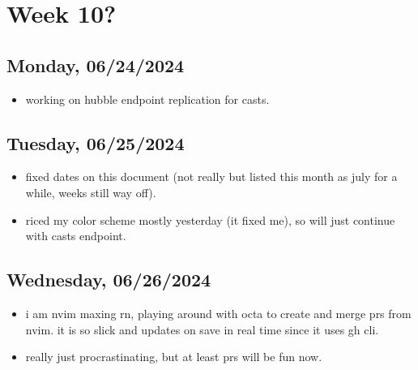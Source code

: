 \newpage
\section{Week 10?}
\subsection*{Monday, 06/24/2024}
\begin{itemize}
    \item working on hubble endpoint replication for casts. 
\end{itemize}

\subsection*{Tuesday, 06/25/2024}
\begin{itemize}
    \item fixed dates on this document (not really but listed this month as july
        for a while, weeks still way off).
    \item riced my color scheme mostly yesterday (it fixed me), so will just
        continue with casts endpoint. 
\end{itemize}

\subsection*{Wednesday, 06/26/2024}
\begin{itemize}
    \item i am nvim maxing rn, playing around with octa to create and merge prs
        from nvim. it is so slick and updates on save in real time since it uses
        gh cli. 
    \item really just procrastinating, but at least prs will be fun now. 
\end{itemize}

\clearpage
